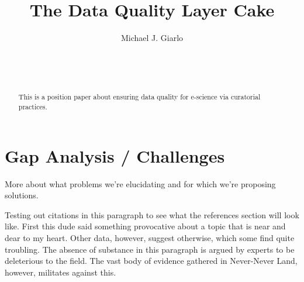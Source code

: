 \documentclass{acm_proc_article-sp}
\begin{document}
\title{The Data Quality Layer Cake}


 \author{
  \alignauthor Michael J. Giarlo\\
  \\
  \\
  \\
   }
\maketitle

\begin{abstract}
  This is a position paper about ensuring data quality for e-science via
  curatorial practices.
\end{abstract}




\section{Gap Analysis / Challenges}
More about what problems we're elucidating and for which we're proposing
solutions.

Testing out citations in this paragraph to see what the references
section will look like.  First this dude\cite{russom:case} said
something provocative\cite{timmer:faking} about a
topic\cite{uw:datascience} that is near and dear\cite{goble:curation}
to my heart\cite{ogburn:imperative}. Other data\cite{jisc:deluge},
however, suggest otherwise\cite{heidorn:libraries}, which some find
quite troubling\cite{williams:lifecycle}. The absence of
substance\cite{revolutions:litreview} in this paragraph is argued by
experts\cite{iam:assurance} to be deleterious to the
field\cite{wiki:identity}. The vast body of
evidence\cite{wiki:quality} gathered in Never-Never Land, however,
militates\cite{wiki:semweb} against this.
\end{document}
